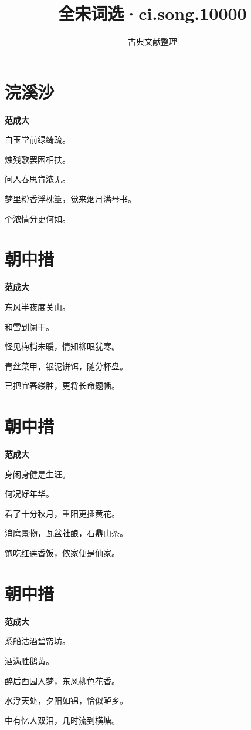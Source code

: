 \documentclass[12pt,a4paper]{ctexbook}
\title{全宋词选·ci.song.10000}
\author{古典文献整理}
\date{}
\begin{document}
\maketitle
\tableofcontents
\newpage
\section{浣溪沙}
\textbf{范成大}\par\vspace{0.5em}
白玉堂前绿绮疏。\par
烛残歌罢困相扶。\par
问人春思肯浓无。\par
梦里粉香浮枕簟，觉来烟月满琴书。\par
个浓情分更何如。\par

\section{朝中措}
\textbf{范成大}\par\vspace{0.5em}
东风半夜度关山。\par
和雪到阑干。\par
怪见梅梢未暖，情知柳眼犹寒。\par
青丝菜甲，银泥饼饵，随分杯盘。\par
已把宜春缕胜，更将长命题幡。\par

\section{朝中措}
\textbf{范成大}\par\vspace{0.5em}
身闲身健是生涯。\par
何况好年华。\par
看了十分秋月，重阳更插黄花。\par
消磨景物，瓦盆社酿，石鼎山茶。\par
饱吃红莲香饭，侬家便是仙家。\par

\section{朝中措}
\textbf{范成大}\par\vspace{0.5em}
系船沽酒碧帘坊。\par
酒满胜鹅黄。\par
醉后西园入梦，东风柳色花香。\par
水浮天处，夕阳如锦，恰似鲈乡。\par
中有忆人双泪，几时流到横塘。\par
\end{document}
